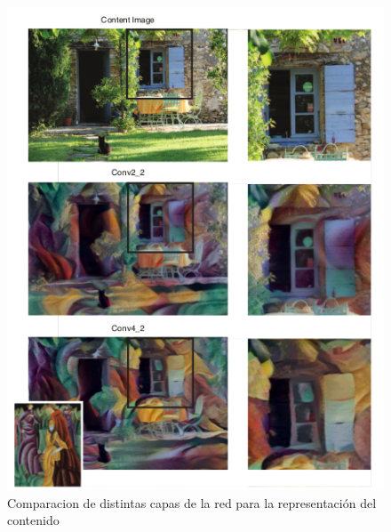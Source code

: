 \documentclass[a4paper,11pt,spanish]{book}
\begin{document}
\begin{itemize}
\begin{figure}[h]
	    \includegraphics[width=\textwidth]{./img/content_repr_layers.png}
	    \caption{Comparacion de distintas capas de la red para la representación del contenido}
	    \label{fig:content_repr_layers}
	 \end{figure}
	 

\end{itemize}
\end{document}
